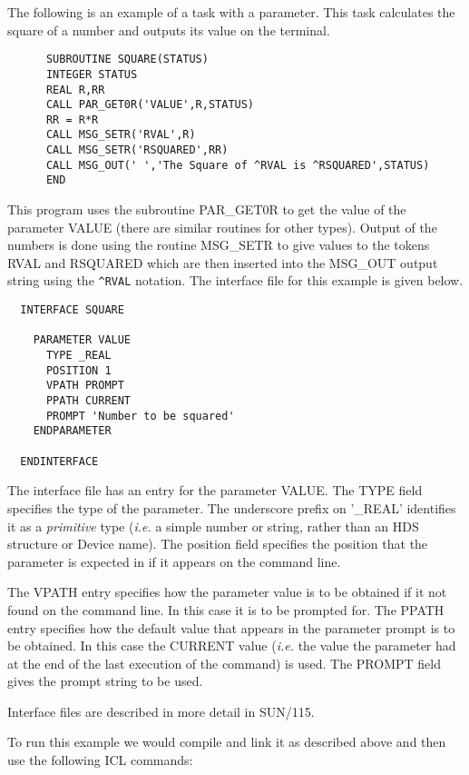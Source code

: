 \documentclass[twoside,11pt]{report}
\begin{document}
The following is an example of a task with a parameter. This task calculates
the square of a number and outputs its value on the terminal.

\begin{verbatim}
      SUBROUTINE SQUARE(STATUS)
      INTEGER STATUS
      REAL R,RR
      CALL PAR_GET0R('VALUE',R,STATUS)
      RR = R*R           
      CALL MSG_SETR('RVAL',R)
      CALL MSG_SETR('RSQUARED',RR)
      CALL MSG_OUT(' ','The Square of ^RVAL is ^RSQUARED',STATUS)
      END
\end{verbatim}                                               

This program uses the subroutine PAR\_GET0R to get the value of the parameter
VALUE (there are similar routines for other types). Output of the numbers
is done using the routine MSG\_SETR to give values to the tokens RVAL and
RSQUARED which are then inserted into the MSG\_OUT output string using
the \verb$^RVAL$ notation. The interface file for this example is given
below.        

\begin{verbatim}
  INTERFACE SQUARE
 
    PARAMETER VALUE
      TYPE _REAL
      POSITION 1
      VPATH PROMPT
      PPATH CURRENT
      PROMPT 'Number to be squared'
    ENDPARAMETER

  ENDINTERFACE
\end{verbatim}               

The interface file has an entry for the parameter VALUE. The TYPE field
specifies the type of the parameter. The underscore prefix on '\_REAL'
identifies it as a {\em primitive} type ({\em i.e.} a simple number or string,
rather than an HDS structure or Device name). The position field specifies
the position that the parameter is expected in if it appears on the command
line.

The VPATH entry specifies how the parameter value is to be obtained if it
not found on the command line. In this case it is to be prompted for. The
PPATH entry specifies how the default value that appears in the parameter
prompt is to be obtained. In this case the CURRENT value ({\em i.e.} the value
the parameter had at the end of the last execution of the command) is used.
The PROMPT field gives the prompt string to be used.

Interface files are described in more detail in SUN/115.
                                                      
To run this example we would compile and link it as described above and
then use the following ICL commands:
\end{document}
